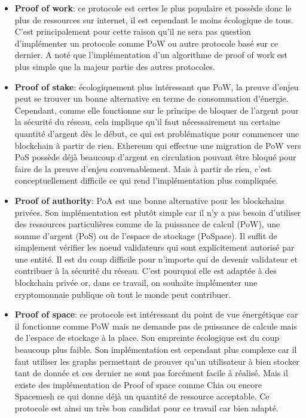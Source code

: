 \begin{itemize}
    \item \textbf{Proof of work}: ce protocole est certes le plus populaire et possède donc le plus de ressources sur internet, il est cependant le moins écologique de tous. C'est principalement pour cette raison qu'il ne sera pas question d'implémenter un protocole comme PoW ou autre protocole basé sur ce dernier. A noté que l'implémentation d'un algorithme de proof of work est plus simple que la majeur partie des autres protocoles.
    \item \textbf{Proof of stake}: écologiquement plus intéressant que PoW, la preuve d'enjeu peut se trouver un bonne alternative en terme de consommation d'énergie. Cependant, comme elle fonctionne sur le principe de bloquer de l'argent pour la sécurité du réseau, cela implique qu'il faut nécessairement un certaine quantité d'argent dès le début, ce qui est problématique pour commencer une blockchain à partir de rien. Ethereum qui effectue une migration de PoW vers PoS possède déjà beaucoup d'argent en circulation pouvant être bloqué pour faire de la preuve d'enjeu convenablement. Mais à partir de rien, c'est conceptuellement difficile ce qui rend l'implémentation plus compliquée.
    \item \textbf{Proof of authority}: PoA est une bonne alternative pour les blockchains privées. Son implémentation est plutôt simple car il n'y a pas besoin d'utiliser des ressources particulières comme de la puissance de calcul (PoW), une somme d'argent (PoS) ou de l'espace de stockage (PoSpace). Il suffit de simplement vérifier les noeud validateurs qui sont explicitement autorisé par une entité. Il est du coup difficile pour n'importe qui de devenir validateur et contribuer à la sécurité du réseau. C'est pourquoi elle est adaptée à des blockchain privée or, dans ce travail, on souhaite implémenter une cryptomonnaie publique où tout le monde peut contribuer.
    \item \textbf{Proof of space}: ce protocole est intéressant du point de vue énergétique car il fonctionne comme PoW mais ne demande pas de puissance de calcule mais de l'espace de stockage à la place. Son empreinte écologique est du coup beaucoup plus faible. Son implémentation est cependant plus complexe car il faut utiliser les graphs permettant de prouver qu'un utilisateur à bien stocker tant de donnée et ces dernier ne sont pas forcément facile à réalisé. Mais il existe des implémentation de Proof of space comme Chia ou encore Spacemesh ce qui donne déjà un quantité de ressource acceptable. Ce protocole est ainsi un très bon candidat pour ce travail car bien adapté.

\end{itemize}

